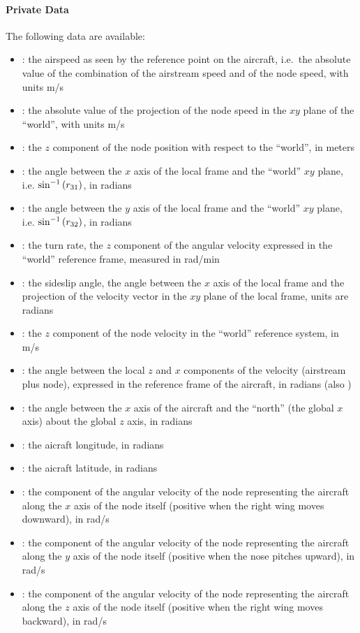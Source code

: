 \paragraph{Private Data}
The following data are available:
\begin{itemize}
\item {}: the airspeed as seen by the reference
	point on the aircraft, i.e.\ the absolute value
	of the combination of the airstream speed and of the node speed,
  with units m/s
\item {}: the absolute value of the projection
	of the node speed in the $xy$ plane of the ``world'', with units m/s
\item {}: the $z$ component of the node position
	with respect to the ``world'', in meters
\item {}: the angle between the $x$ axis of the local
  frame and the ``world'' $xy$ plane,  i.e. $\sin^{-1}\left( r_{31} \right)$,
  in radians
\item {}: the angle between the $y$ axis of the local
	frame and the ``world'' $xy$ plane, i.e. $\sin^{-1}\left( r_{32} \right)$,
  in radians
\item {}: the turn rate, the $z$ component of the angular
  velocity expressed in the ``world'' reference frame, measured in rad/min
\item {}: the sideslip angle, the angle between the $x$ axis of
  the local frame and the projection of the velocity vector in the $xy$
  plane of the local frame, units are radians
\item {}: the $z$ component of the node velocity
	in the ``world'' reference system, in m/s
\item {}: the angle between the local $z$ and $x$ components
	of the velocity (airstream plus node), expressed in the reference frame
  of the aircraft, in radians (also )
\item {}: the angle between the $x$ axis of the aircraft
	and the ``north'' (the global $x$ axis) about the global $z$ axis,
  in radians
\item {}: the aicraft longitude, in radians
\item {}: the aicraft latitude, in radians
\item {}: the component of the angular velocity
	of the node representing the aircraft along the $x$ axis
	of the node itself (positive when the right wing moves downward),
  in rad/s
\item {}: the component of the angular velocity
	of the node representing the aircraft along the $y$ axis
	of the node itself (positive when the nose pitches upward),
  in rad/s
\item {}: the component of the angular velocity
	of the node representing the aircraft along the $z$ axis
	of the node itself (positive when the right wing moves backward),
  in rad/s
\end{itemize}
